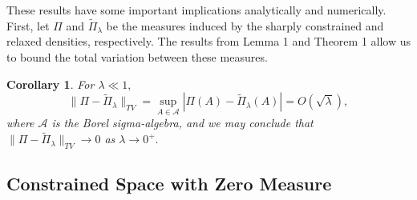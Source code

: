 \documentclass[10pt,fleqn]{article}
\newtheorem{corollary}{Corollary} \newtheorem{remark}{Remark}
\newcommand{\bb}[1]{\mathbb{#1}} \newcommand{\mc}[1]{\mathcal{#1}}
\DeclareMathOperator{\1}{\mathbbm{1}} \DeclareMathOperator{\bigO}{\mc O}
\begin{document}
These results have some important implications analytically and numerically.  First, let $\Pi$ and $\tilde{\Pi}_\lambda$ be the measures induced by the sharply constrained and relaxed densities, respectively. The results from Lemma 1 and Theorem 1 allow us to bound the total variation between these measures.
\begin{corollary} For $\lambda \ll 1,$ 
$$\| \Pi - \tilde{\Pi}_{\lambda}\|_{TV} = \sup_{A \in \mathcal{A}} | \Pi(A) - \tilde{\Pi}_\lambda(A) |= O(\sqrt{\lambda}),$$
where $\mathcal{A}$ is the Borel sigma-algebra, 
and we may conclude that $\| \Pi - \tilde{\Pi}_{\lambda}\|_{TV} \to 0$ as $\lambda \to 0^+.$
\label{COR:TV_Positive_Measure}
\end{corollary} 

\subsection{Constrained Space with Zero Measure}
\label{SEC:Zero_measure_theory}
\end{document}
